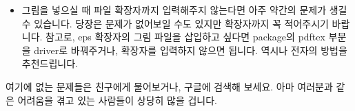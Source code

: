 \begin{itemize}
	\item 그림을 넣으실 때 파일 확장자까지 입력해주지 않는다면 아주 약간의 문제가 생길 수 있습니다.
	당장은 문제가 없어보일 수도 있지만 확장자까지 꼭 적어주시기 바랍니다.
	참고로, eps 확장자의 그림 파일을 삽입하고 싶다면 package의 pdftex 부분을 driver로 바꿔주거나, 확장자를 입력하지 않으면 됩니다.
	역시나 전자의 방법을 추천드립니다.
	
	
\end{itemize}
여기에 없는 문제들은 친구에게 물어보거나, 구글에 검색해 보세요. 아마 여러분과 같은 어려움을 겪고 있는 사람들이 상당히 많을 겁니다.



